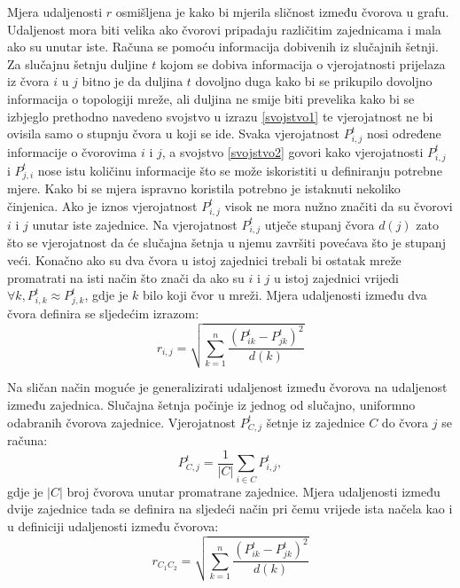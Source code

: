 Mjera udaljenosti $r$ osmišljena je kako bi mjerila sličnost između čvorova u grafu. Udaljenost mora biti velika ako čvorovi pripadaju različitim zajednicama i mala ako su unutar iste. Računa se pomoću informacija dobivenih iz slučajnih šetnji. Za slučajnu šetnju duljine $t$ kojom se dobiva informacija o vjerojatnosti prijelaza iz čvora $i$ u $j$ bitno je da duljina $t$ dovoljno duga kako bi se prikupilo dovoljno informacija o topologiji mreže, ali duljina ne smije biti prevelika kako bi se izbjeglo prethodno navedeno svojstvo u izrazu \ref{svojstvo1} te vjerojatnost ne bi ovisila samo o stupnju čvora u koji se ide. Svaka vjerojatnost $P_{i,j}^{t}$ nosi određene informacije o čvorovima $i$ i $j$, a svojstvo \ref{svojstvo2} govori kako vjerojatnosti $P_{i,j}^{t}$ i $P_{j,i}^{t}$ nose istu količinu informacije što se može iskoristiti u definiranju potrebne mjere. Kako bi se mjera ispravno koristila potrebno je istaknuti nekoliko činjenica. Ako je iznos vjerojatnost $P_{i,j}^{t}$ visok ne mora nužno značiti da su čvorovi $i$ i $j$ unutar iste zajednice. Na vjerojatnost $P_{i,j}^{t}$ utječe stupanj čvora $d(j)$ zato što se vjerojatnost da će slučajna šetnja u njemu završiti povećava što je stupanj veći. Konačno ako su dva čvora u istoj zajednici trebali bi ostatak mreže promatrati na isti način što znači da ako su $i$ i $j$ u istoj zajednici vrijedi $\forall k, P_{i,k}^{t} \approx P_{j,k}^{t}$, gdje je $k$ bilo koji čvor u mreži. Mjera udaljenosti između dva čvora definira se sljedećim izrazom:
\begin{equation}
	r_{i,j} = \sqrt{\sum_{k=1}^{n} \frac{(P_{ik}^{t} - P_{jk}^{t})^{2}}{d(k)}}
\end{equation}

Na sličan način moguće je generalizirati udaljenost između čvorova na udaljenost između zajednica. Slučajna šetnja počinje iz jednog od slučajno, uniformno odabranih čvorova zajednice. Vjerojatnost $P^{t}_{C,j}$ šetnje iz zajednice $C$ do čvora $j$ se računa:
\begin{equation}
	P^{t}_{C,j} = \frac{1}{|C|} \sum_{i \in C} P^{t}_{i,j},
\end{equation}
gdje je $|C|$ broj čvorova unutar promatrane zajednice. Mjera udaljenosti između dvije zajednice tada se definira na sljedeći način pri čemu vrijede ista načela kao i u definiciji udaljenosti između čvorova:
\begin{equation}
	r_{C_{1}C_{2}} = \sqrt{\sum_{k=1}^{n} \frac{(P_{ik}^{t} - P_{jk}^{t})^{2}} {d(k)}}
\end{equation}


